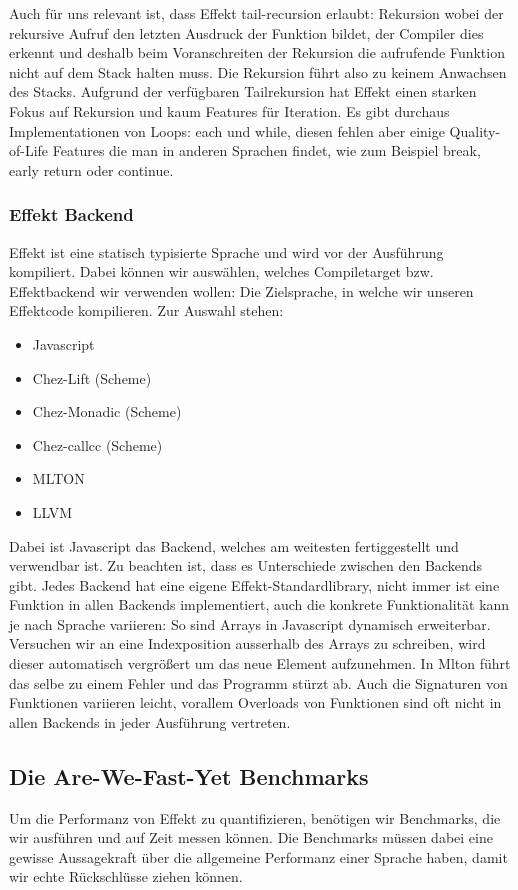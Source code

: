 Auch für uns relevant ist, dass Effekt tail-recursion erlaubt: Rekursion wobei der rekursive Aufruf den letzten Ausdruck der Funktion bildet, der Compiler dies erkennt und deshalb beim Voranschreiten der Rekursion die aufrufende Funktion nicht auf dem Stack halten muss. Die Rekursion führt also zu keinem Anwachsen des Stacks. 
Aufgrund der verfügbaren Tailrekursion hat Effekt einen starken Fokus auf Rekursion und kaum Features für Iteration. Es gibt durchaus Implementationen von Loops: each und while, diesen fehlen aber einige Quality-of-Life Features die man in anderen Sprachen findet, wie zum Beispiel break, early return oder continue.

\subsubsection{ Effekt Backend }
Effekt ist eine statisch typisierte Sprache und wird vor der Ausführung kompiliert.
Dabei können wir auswählen, welches Compiletarget bzw. Effektbackend wir verwenden wollen: Die Zielsprache, in welche wir unseren Effektcode kompilieren.
Zur Auswahl stehen:
\begin{itemize}
    \item Javascript
    \item Chez-Lift (Scheme)
    \item Chez-Monadic (Scheme)
    \item Chez-callcc (Scheme)
    \item MLTON
    \item LLVM
\end{itemize}
Dabei ist Javascript das Backend, welches am weitesten fertiggestellt und verwendbar ist. 
Zu beachten ist, dass es Unterschiede zwischen den Backends gibt.
Jedes Backend hat eine eigene Effekt-Standardlibrary, nicht immer ist eine Funktion in allen Backends implementiert, auch die konkrete Funktionalität kann je nach Sprache variieren:
So sind Arrays in Javascript dynamisch erweiterbar. Versuchen wir an eine Indexposition ausserhalb des Arrays zu schreiben, wird dieser automatisch vergrößert um das neue Element aufzunehmen.
In Mlton führt das selbe zu einem Fehler und das Programm stürzt ab.
Auch die Signaturen von Funktionen variieren leicht, vorallem Overloads von Funktionen sind oft nicht in allen Backends in jeder Ausführung vertreten.

\subsection{ Die Are-We-Fast-Yet Benchmarks }
Um die Performanz von Effekt zu quantifizieren, benötigen wir Benchmarks, die wir ausführen und auf Zeit messen können. Die Benchmarks müssen dabei eine gewisse Aussagekraft über die allgemeine Performanz einer Sprache haben, damit wir echte Rückschlüsse ziehen können.

